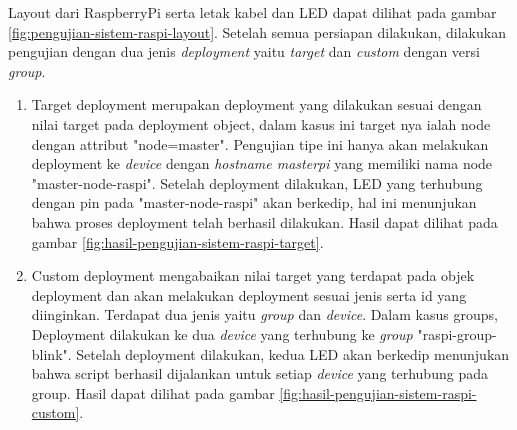 Layout dari RaspberryPi serta letak kabel dan LED dapat dilihat pada gambar \ref{fig:pengujian-sistem-raspi-layout}. Setelah semua persiapan dilakukan, dilakukan pengujian dengan dua jenis \textit{deployment} yaitu \textit{target} dan \textit{custom} dengan versi \textit{group}.
\begin{enumerate}
  \item Target deployment merupakan deployment yang dilakukan sesuai dengan nilai target pada deployment object, dalam kasus ini target nya ialah node dengan attribut "node=master". Pengujian tipe ini hanya akan melakukan deployment ke \textit{device} dengan \textit{hostname masterpi} yang memiliki nama node "master-node-raspi". Setelah deployment dilakukan, LED yang terhubung dengan pin pada "master-node-raspi" akan berkedip, hal ini menunjukan bahwa proses deployment telah berhasil dilakukan. Hasil dapat dilihat pada gambar \ref{fig:hasil-pengujian-sistem-raspi-target}.
  \item Custom deployment mengabaikan nilai target yang terdapat pada objek deployment dan akan melakukan deployment sesuai jenis serta id yang diinginkan. Terdapat dua jenis yaitu \textit{group} dan \textit{device}. Dalam kasus groups, Deployment dilakukan ke dua \textit{device} yang terhubung ke \textit{group} "raspi-group-blink". Setelah deployment dilakukan, kedua LED akan berkedip menunjukan bahwa script berhasil dijalankan untuk setiap \textit{device} yang terhubung pada group. Hasil dapat dilihat pada gambar \ref{fig:hasil-pengujian-sistem-raspi-custom}.
\end{enumerate}


